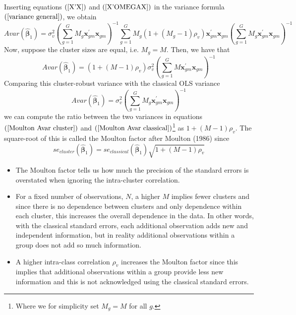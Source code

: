 \documentclass{article}
\begin{document}
Inserting equations $\left( \ref{X'X}\right) $ and $\left( \ref{X'OMEGAX}%
\right) $ in the variance formula $\left( \ref{variance general}\right) $,
we obtain%
\begin{equation*}
Avar\left( \mathbf{\hat{\beta}}_{1}\right) =\sigma _{v}^{2}\left(
\sum_{g=1}^{G}M_{g}\mathbf{x}_{gm}^{\prime }\mathbf{x}_{gm}\right)
^{-1}\sum_{g=1}^{G}M_{g}\left( 1+\left( M_{g}-1\right) \rho _{v}\right) 
\mathbf{x}_{gm}^{\prime }\mathbf{x}_{gm}\left( \sum_{g=1}^{G}M_{g}\mathbf{x}%
_{gm}^{\prime }\mathbf{x}_{gm}\right) ^{-1}
\end{equation*}%
Now, suppose the cluster sizes are equal, i.e. $M_{g}=M$. Then, we have that%
\begin{equation}
Avar\left( \mathbf{\hat{\beta}}_{1}\right) =\left( 1+\left( M-1\right) \rho
_{v}\right) \sigma _{v}^{2}\left( \sum_{g=1}^{G}M\mathbf{x}_{gm}^{\prime }%
\mathbf{x}_{gm}\right) ^{-1}  \label{Moulton Avar cluster}
\end{equation}%
Comparing this cluster-robust variance with the classical OLS variance%
\begin{equation}
Avar\left( \mathbf{\hat{\beta}}_{1}\right) =\sigma _{v}^{2}\left(
\sum_{g=1}^{G}M_{g}\mathbf{x}_{gm}^{\prime }\mathbf{x}_{gm}\right) ^{-1}
\label{Moulton Avar classical}
\end{equation}%
we can compute the ratio between the two variances in equations $\left( \ref%
{Moulton Avar cluster}\right) $ and $\left( \ref{Moulton Avar classical}%
\right) $\footnote{%
Where we for simplicity set $M_{g}=M$ for all $g$.} as $1+\left( M-1\right)
\rho _{v}$. The square-root of this is called the Moulton factor after
Moulton (1986) since%
\begin{equation*}
se_{cluster}\left( \mathbf{\hat{\beta}}_{1}\right) =se_{classical}\left( 
\mathbf{\hat{\beta}}_{1}\right) \sqrt{1+\left( M-1\right) \rho _{v}}
\end{equation*}

\begin{itemize}
\item The Moulton factor tells us how much the precision of the standard
errors is overstated when ignoring the intra-cluster correlation.

\item For a fixed number of observations, $N$, a higher $M$ implies fewer
clusters and since there is no dependence between clusters and only
dependence within each cluster, this increases the overall dependence in the
data. In other words, with the classical standard errors, each additional
observation adds new and independent information, but in reality additional
observations within a group does not add so much information.

\item A higher intra-class correlation $\rho _{v}$ increases the Moulton
factor since this implies that additional observations within a group
provide less new information and this is not acknowledged using the
classical standard errors.
\end{itemize}
\end{document}
